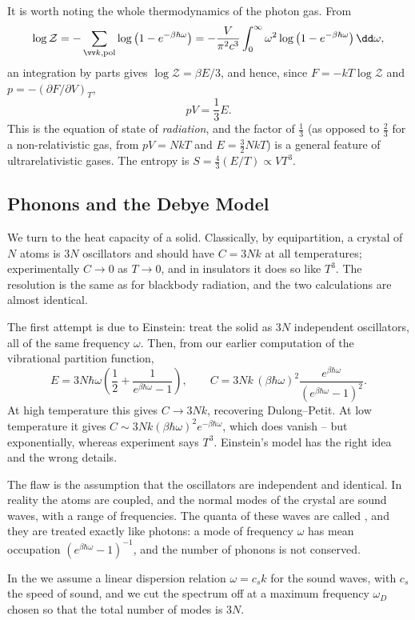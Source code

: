 It is worth noting the whole thermodynamics of the photon gas. From
$$
\log \mathcal Z = -\sum_{\vv k, \text{pol}} \log\left(1 - e^{-\beta\hbar\omega}\right) = -\frac{V}{\pi^2c^3}\int_0^\infty \omega^2 \log\left(1-e^{-\beta\hbar\omega}\right)\dd\omega,
$$
an integration by parts gives $\log\mathcal Z = \beta E/3$, and hence, since $F = -kT\log \mathcal Z$ and $p = -(\partial F/\partial V)_T$,
$$
pV = \frac 13 E.
$$
This is the equation of state of \emph{radiation}, and the factor of $\tfrac 13$ (as opposed to $\tfrac 23$ for a non-relativistic gas, from $pV = NkT$ and $E = \tfrac 32 NkT$) is a general feature of ultrarelativistic gases. The entropy is $S = \tfrac 43 (E/T) \propto VT^3$.

\subsection{Phonons and the Debye Model}\label{sec:debye}

We turn to the heat capacity of a solid. Classically, by equipartition, a crystal of $N$ atoms is $3N$ oscillators and should have $C = 3Nk$ at all temperatures; experimentally $C \to 0$ as $T \to 0$, and in insulators it does so like $T^3$. The resolution is the same as for blackbody radiation, and the two calculations are almost identical.

The first attempt is due to Einstein: treat the solid as $3N$ independent oscillators, all of the same frequency $\omega$. Then, from our earlier computation of the vibrational partition function,
$$
E = 3N\hbar\omega\left(\frac 12 + \frac{1}{e^{\beta\hbar\omega}-1}\right), \qquad C = 3Nk\,(\beta\hbar\omega)^2 \frac{e^{\beta\hbar\omega}}{(e^{\beta\hbar\omega}-1)^2}.
$$
At high temperature this gives $C \to 3Nk$, recovering Dulong--Petit. At low temperature it gives $C \sim 3Nk(\beta\hbar\omega)^2 e^{-\beta\hbar\omega}$, which does vanish -- but exponentially, whereas experiment says $T^3$. Einstein's model has the right idea and the wrong details.

The flaw is the assumption that the oscillators are independent and identical. In reality the atoms are coupled, and the normal modes of the crystal are sound waves, with a range of frequencies. The quanta of these waves are called , and they are treated exactly like photons: a mode of frequency $\omega$ has mean occupation $(e^{\beta\hbar\omega}-1)^{-1}$, and the number of phonons is not conserved.

\begin{definition}
	In the  we assume a linear dispersion relation $\omega = c_s k$ for the sound waves, with $c_s$ the speed of sound, and we cut the spectrum off at a maximum frequency $\omega_D$ chosen so that the total number of modes is $3N$.
\end{definition}

